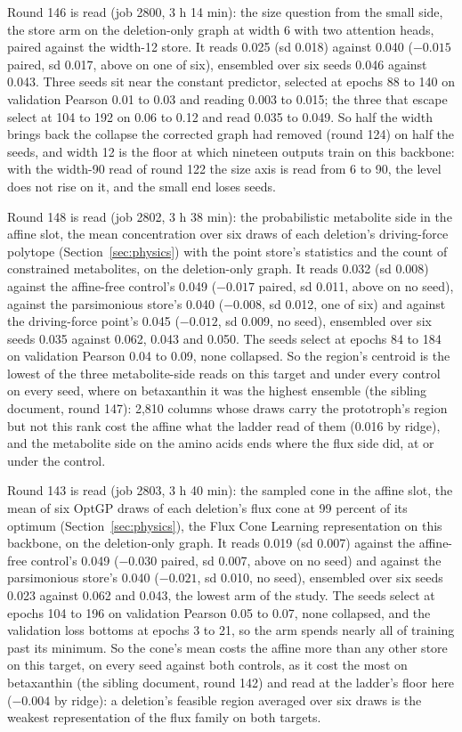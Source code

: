 Round 146 is read (job 2800, 3 h 14 min): the size question from the small side, the
store arm on the deletion-only graph at width 6 with two attention heads, paired
against the width-12 store. It reads 0.025 (sd 0.018) against 0.040 ($-0.015$ paired,
sd 0.017, above on one of six), ensembled over six seeds 0.046 against 0.043. Three
seeds sit near the constant predictor, selected at epochs 88 to 140 on validation
Pearson 0.01 to 0.03 and reading 0.003 to 0.015; the three that escape select at 104
to 192 on 0.06 to 0.12 and read 0.035 to 0.049. So half the width brings back the
collapse the corrected graph had removed (round 124) on half the seeds, and width 12
is the floor at which nineteen outputs train on this backbone: with the width-90 read
of round 122 the size axis is read from 6 to 90, the level does not rise on it, and
the small end loses seeds.

Round 148 is read (job 2802, 3 h 38 min): the probabilistic metabolite side in the
affine slot, the mean concentration over six draws of each deletion's driving-force
polytope (Section~\ref{sec:physics}) with the point store's statistics and the count
of constrained metabolites, on the deletion-only graph. It reads 0.032 (sd 0.008)
against the affine-free control's 0.049 ($-0.017$ paired, sd 0.011, above on no seed),
against the parsimonious store's 0.040 ($-0.008$, sd 0.012, one of six) and against
the driving-force point's 0.045 ($-0.012$, sd 0.009, no seed), ensembled over six
seeds 0.035 against 0.062, 0.043 and 0.050. The seeds select at epochs 84 to 184 on
validation Pearson 0.04 to 0.09, none collapsed. So the region's centroid is the lowest
of the three metabolite-side reads on this target and under every control on every
seed, where on betaxanthin it was the highest ensemble (the sibling document, round
147): 2,810 columns whose draws carry the prototroph's region but not this rank cost
the affine what the ladder read of them (0.016 by ridge), and the metabolite side on
the amino acids ends where the flux side did, at or under the control.

Round 143 is read (job 2803, 3 h 40 min): the sampled cone in the affine slot, the
mean of six OptGP draws of each deletion's flux cone at 99 percent of its optimum
(Section~\ref{sec:physics}), the Flux Cone Learning representation on this backbone,
on the deletion-only graph. It reads 0.019 (sd 0.007) against the affine-free
control's 0.049 ($-0.030$ paired, sd 0.007, above on no seed) and against the
parsimonious store's 0.040 ($-0.021$, sd 0.010, no seed), ensembled over six seeds
0.023 against 0.062 and 0.043, the lowest arm of the study. The seeds select at epochs
104 to 196 on validation Pearson 0.05 to 0.07, none collapsed, and the validation loss
bottoms at epochs 3 to 21, so the arm spends nearly all of training past its minimum.
So the cone's mean costs the affine more than any other store on this target, on every
seed against both controls, as it cost the most on betaxanthin (the sibling document,
round 142) and read at the ladder's floor here ($-0.004$ by ridge): a deletion's
feasible region averaged over six draws is the weakest representation of the flux
family on both targets.


